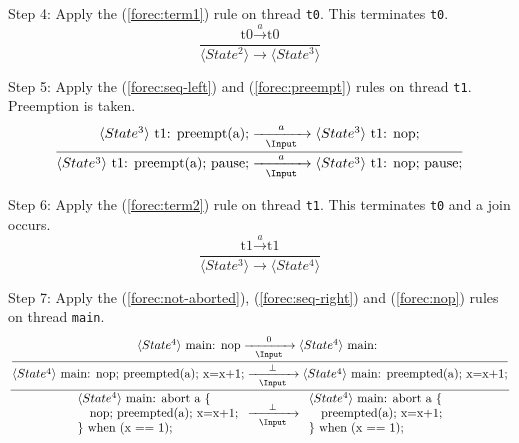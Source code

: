 \noindent
Step 4: Apply the (\ref{forec:term1}) rule on thread \verb$t0$. 
This terminates \verb$t0$.
\begin{equation*}
	\frac{
			\text{t0} \xrightarrow{~~a~~} \text{t0}
		}{
			\langle State^2 \rangle \xrightarrow{~~~~~} \langle State^3 \rangle
		}
\end{equation*}

\noindent
Step 5: Apply the (\ref{forec:seq-left}) and (\ref{forec:preempt}) rules
on thread \verb$t1$. Preemption is taken.
\begin{equation*}
	\frac{
		\langle State^3 \rangle ~ \text{t1: preempt(a);}
			\xrightarrow[~~\Input~~]{~~a~~} 
		\langle State^3 \rangle ~ \text{t1: nop;}
	}{
		\langle State^3 \rangle ~ \text{t1: preempt(a); pause;}
			\xrightarrow[~~\Input~~]{~~a~~} 
		\langle State^3 \rangle ~ \text{t1: nop; pause;}
	}
\end{equation*}

\noindent
Step 6: Apply the (\ref{forec:term2}) rule on thread \verb$t1$. 
This terminates \verb$t0$ and a join occurs.
\begin{equation*}
	\frac{
			\text{t1} \xrightarrow{~~a~~} \text{t1}
		}{
			\langle State^3 \rangle \xrightarrow{~~~~~} \langle State^4 \rangle
		}
\end{equation*}

\noindent
Step 7: Apply the (\ref{forec:not-aborted}), (\ref{forec:seq-right}) and 
(\ref{forec:nop}) rules on thread \verb$main$.
\begin{equation*}
	\frac{
		\dfrac{
				\langle State^4 \rangle ~ \text{main: nop}
					\xrightarrow[~~\Input~~]{0} 
				\langle State^4 \rangle ~ \text{main: }
			}{
				\langle State^4 \rangle ~ \text{main: nop; preempted(a); x=x+1;}					
					\xrightarrow[~~\Input~~]{\bot} 
				\langle State^4 \rangle ~ \text{main: preempted(a); x=x+1;}				
			}
		}{
			\begin{array}{l}
				\langle State^4 \rangle ~ \text{main: abort a \{}	\\
				\text{~~~nop; preempted(a); x=x+1;}					\\
				\text{\} when (x == 1);}							
			\end{array}
				\xrightarrow[~~\Input~~]{\bot} 
			\begin{array}{l}
				\langle State^4 \rangle ~ \text{main: abort a \{}	\\
				\text{~~~preempted(a); x=x+1;}						\\
				\text{\} when (x == 1);}							
			\end{array}
		}
\end{equation*}

